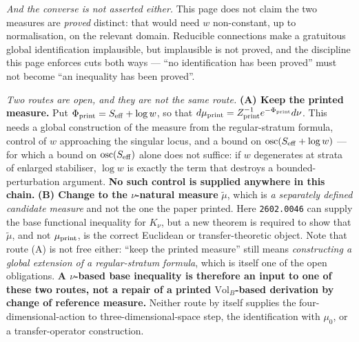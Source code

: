 \documentclass[11pt]{article}
\begin{document}
\emph{And the converse is not asserted either.} This page does not claim the two
measures are \emph{proved} distinct: that would need $w$ non-constant, up to
normalisation, on the relevant domain. Reducible connections make a gratuitous global
identification implausible, but implausible is not proved, and the discipline this
page enforces cuts both ways --- ``no identification has been proved'' must not become
``an inequality has been proved''.

\emph{Two routes are open, and they are not the same route.}
\textbf{(A) Keep the printed measure.} Put $\Phi_{\rm print}=S_{\rm eff}+\log w$, so
that $d\mu_{\rm print}=Z_{\rm print}^{-1}e^{-\Phi_{\rm print}}d\nu$. This needs a
global construction of the measure from the regular-stratum formula, control of $w$
approaching the singular locus, and a bound on
$\operatorname{osc}(S_{\rm eff}+\log w)$ --- for which a bound on
$\operatorname{osc}(S_{\rm eff})$ alone does not suffice: if $w$ degenerates at strata
of enlarged stabiliser, $\log w$ is exactly the term that destroys a
bounded-perturbation argument. \textbf{No such control is supplied anywhere in this
chain.}
\textbf{(B) Change to the $\nu$-natural measure} $\widetilde\mu$, which is
\emph{a separately defined candidate measure} and not the one the paper printed. Here
\texttt{2602.0046} can supply the base functional inequality for $K_\nu$, but a new
theorem is required to show that $\widetilde\mu$, and not $\mu_{\rm print}$, is the
correct Euclidean or transfer-theoretic object. Note that route (A) is not free
either: ``keep the printed measure'' still means \emph{constructing a global extension
of a regular-stratum formula}, which is itself one of the open obligations. \textbf{A $\nu$-based base inequality is therefore an input to one of these
two routes, not a repair of a printed $\mathrm{Vol}_B$-based derivation by change of
reference measure.} Neither route by itself supplies the four-dimensional-action to
three-dimensional-space step, the identification with $\mu_0$, or a transfer-operator
construction.
\end{document}
